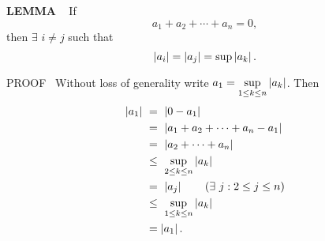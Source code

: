 \begin{x}{\small\bf LEMMA} \ %
If
\[
a_1 + a_2 + \dotsb + a_n = 0, 
\]
then $\exists$  $i \ne j$ such that
\[
\left\vert a_i\right\vert = \left\vert a_j\right\vert = \sup\left\vert a_k\right\vert.
\]

PROOF \
Without loss of generality write $a_1 = \sup\limits_{1 \leq k \leq n}\left\vert a_k\right\vert$.  Then
\allowdisplaybreaks
\begin{align*}
\abs{a_1} 	\ 
&=\  \abs{0 - a_1}\\	
&=\  \abs{a_1 + a_2 + \dotsb + a_n - a_1}\\
&=\  \abs{a_2 + \dotsb + a_n}\\	
&\leq\ \sup\limits_{2 \leq k \leq n}\abs{a_k}\\
&=\ \abs{a_j} \qquad (\exists \ j: 2 \leq j \leq n)\\
&\leq\ \sup\limits_{1\leq k \leq n}\abs{a_k}\\
&= \abs{a_1}.
\end{align*}

\end{x}


















